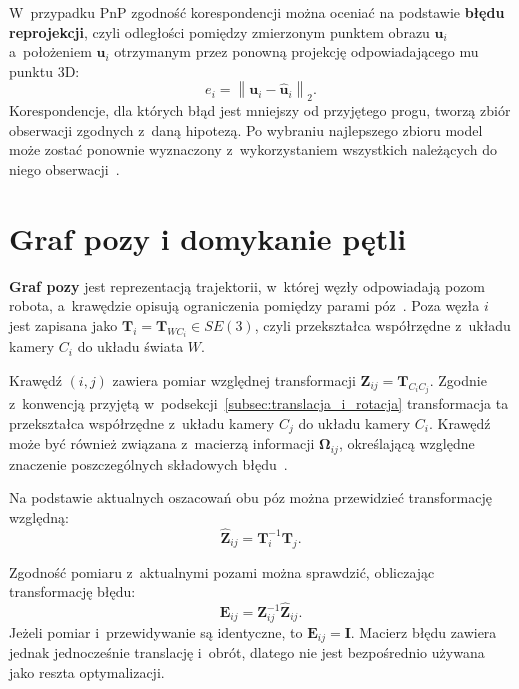 W~przypadku PnP zgodność korespondencji można oceniać na podstawie \textbf{błędu reprojekcji}, czyli odległości pomiędzy zmierzonym punktem obrazu $\mathbf{u}_i$ a~położeniem $\hat{\mathbf{u}}_i$ otrzymanym przez ponowną projekcję odpowiadającego mu punktu 3D:
\begin{equation}
e_i
=
\left\|
\mathbf{u}_i-\hat{\mathbf{u}}_i
\right\|_2.
\label{eq:reprojection_error}
\end{equation}
Korespondencje, dla których błąd jest mniejszy od przyjętego progu, tworzą zbiór obserwacji zgodnych z~daną hipotezą. Po wybraniu najlepszego zbioru model może zostać ponownie wyznaczony z~wykorzystaniem wszystkich należących do niego obserwacji~\cite{fischler1981ransac}.


\section{Graf pozy i domykanie pętli}
\label{sec:graf_pozy}

\textbf{Graf pozy} jest reprezentacją trajektorii, w~której węzły odpowiadają pozom robota, a~krawędzie opisują ograniczenia pomiędzy parami póz~\cite{grisetti2010graph}. Poza węzła $i$ jest zapisana jako $\mathbf{T}_i=\mathbf{T}_{W C_i}\in SE(3)$, czyli przekształca współrzędne z~układu kamery $C_i$ do układu świata $W$.

Krawędź $(i,j)$ zawiera pomiar względnej transformacji $\mathbf{Z}_{ij}=\mathbf{T}_{C_i C_j}$. Zgodnie z~konwencją przyjętą w~podsekcji~\ref{subsec:translacja_i_rotacja} transformacja ta przekształca współrzędne z~układu kamery $C_j$ do układu kamery $C_i$. Krawędź może być również związana z~macierzą informacji $\boldsymbol{\Omega}_{ij}$, określającą względne znaczenie poszczególnych składowych błędu~\cite{grisetti2010graph}.

Na podstawie aktualnych oszacowań obu póz można przewidzieć transformację względną:
\begin{equation}
    \hat{\mathbf{Z}}_{ij}
    =
    \mathbf{T}_i^{-1}\mathbf{T}_j.
    \label{eq:predicted_relative_pose}
\end{equation}

Zgodność pomiaru z~aktualnymi pozami można sprawdzić, obliczając transformację błędu:
\begin{equation}
    \mathbf{E}_{ij}
    =
    \mathbf{Z}_{ij}^{-1}\hat{\mathbf{Z}}_{ij}.
    \label{eq:pose_graph_error_transform}
\end{equation}
Jeżeli pomiar i~przewidywanie są identyczne, to $\mathbf{E}_{ij}=\mathbf{I}$. Macierz błędu zawiera jednak jednocześnie translację i~obrót, dlatego nie jest bezpośrednio używana jako reszta optymalizacji.

